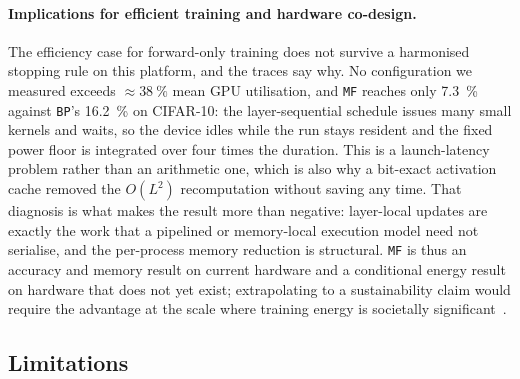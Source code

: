 \documentclass{llncs}
\newcommand{\MF}{\texttt{MF}}
\newcommand{\BP}{\texttt{BP}}
\begin{document}
\paragraph{Implications for efficient training and hardware co-design.}
\label{sec:discussion_hardware_codesign}
The efficiency case for forward-only training does not survive a harmonised
stopping rule on this platform, and the traces say why. No configuration we
measured exceeds ${\approx}\SI{38}{\percent}$ mean GPU utilisation, and \MF{}
reaches only \SI{7.3}{\percent} against \BP{}'s \SI{16.2}{\percent} on
CIFAR-10: the layer-sequential schedule issues many small kernels and waits,
so the device idles while the run stays resident and the fixed power floor is
integrated over four times the duration. This is a launch-latency problem
rather than an arithmetic one, which is also why a bit-exact activation cache
removed the $O(L^2)$ recomputation without saving any time. That diagnosis is
what makes the result more than negative: layer-local updates are exactly the
work that a pipelined or memory-local execution model need not serialise, and
the per-process memory reduction is structural. \MF{} is thus an accuracy and
memory result on current hardware and a conditional energy result on hardware
that does not yet exist; extrapolating to a sustainability claim would require
the advantage at the scale where training energy is societally
significant~\cite{strubell2019energy,patterson2021carbon}.

\subsection{Limitations}
\label{sec:limitations}
\end{document}
